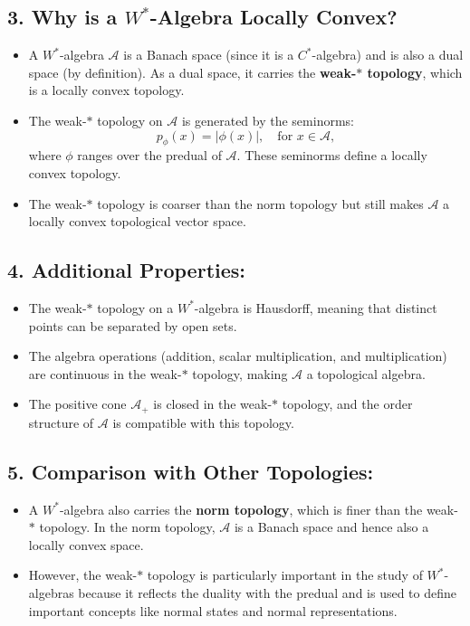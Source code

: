 \documentclass{article}
\begin{document}
\subsection*{3. Why is a \( W^* \)-Algebra Locally Convex?}
\begin{itemize}
    \item A \( W^* \)-algebra \( \mathcal{A} \) is a Banach space (since it is a \( C^* \)-algebra) and is also a dual space (by definition). As a dual space, it carries the \textbf{weak-\( * \) topology}, which is a locally convex topology.
    \item The weak-\( * \) topology on \( \mathcal{A} \) is generated by the seminorms:
    \[
    p_\phi(x) = |\phi(x)|, \quad \text{for } x \in \mathcal{A},
    \]
    where \( \phi \) ranges over the predual of \( \mathcal{A} \). These seminorms define a locally convex topology.
    \item The weak-\( * \) topology is coarser than the norm topology but still makes \( \mathcal{A} \) a locally convex topological vector space.
\end{itemize}

\subsection*{4. Additional Properties:}
\begin{itemize}
    \item The weak-\( * \) topology on a \( W^* \)-algebra is Hausdorff, meaning that distinct points can be separated by open sets.
    \item The algebra operations (addition, scalar multiplication, and multiplication) are continuous in the weak-\( * \) topology, making \( \mathcal{A} \) a topological algebra.
    \item The positive cone \( \mathcal{A}_+ \) is closed in the weak-\( * \) topology, and the order structure of \( \mathcal{A} \) is compatible with this topology.
\end{itemize}

\subsection*{5. Comparison with Other Topologies:}
\begin{itemize}
    \item A \( W^* \)-algebra also carries the \textbf{norm topology}, which is finer than the weak-\( * \) topology. In the norm topology, \( \mathcal{A} \) is a Banach space and hence also a locally convex space.
    \item However, the weak-\( * \) topology is particularly important in the study of \( W^* \)-algebras because it reflects the duality with the predual and is used to define important concepts like normal states and normal representations.
\end{itemize}
\end{document}
